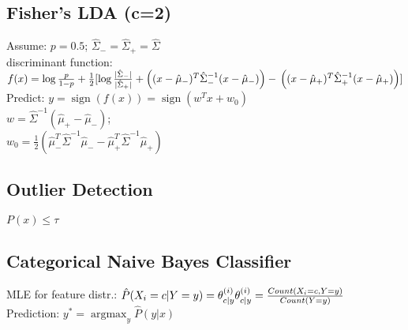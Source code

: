 \subsection*{Fisher's LDA (c=2)}
Assume: $p = 0.5$; $\hat{\Sigma}_- = \hat{\Sigma}_+ = \hat{\Sigma}$\\
discriminant function: 
$f(x) = \operatorname{log} \frac{p}{1-p} + \\
\frac{1}{2}[\operatorname{log} \frac{|\hat{\Sigma}_-|}{|\hat{\Sigma}_+|}
+ \left((x - \hat{\mu}_-)^T \hat{\Sigma}_-^{-1} (x - \hat{\mu}_-)\right) - \\
\left((x - \hat{\mu}_+)^T \hat{\Sigma}_+^{-1} (x - \hat{\mu}_+)\right)]$\\
Predict: $y = \operatorname{sign}(f(x)) = \operatorname{sign} (w^T x + w_0)$\\
$w = \hat{\Sigma}^{-1}(\hat{\mu}_+ - \hat{\mu}_-)$; \\
$w_0 = \frac{1}{2}(\hat{\mu}_-^T\hat{\Sigma}^{-1}\hat{\mu}_- - \hat{\mu}_+^T \hat{\Sigma}^{-1}\hat{\mu}_+)$

\subsection*{Outlier Detection}
$P(x) \leq \tau$

\subsection*{Categorical Naive Bayes Classifier}
MLE for feature distr.:
$\hat{P}(X_i = c|Y = y) = \theta_{c|y}^{(i)}\\
\theta_{c|y}^{(i)} = \frac{Count(X_i = c, Y = y)}{Count(Y=y)}$\\
Prediction: $y^* = \operatorname{argmax}_y\hat{P}(y|x)$